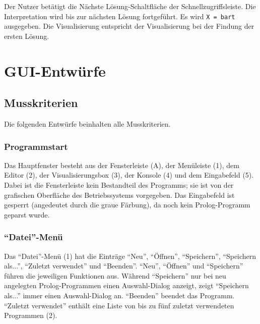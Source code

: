 \documentclass[parskip=full,11pt,twoside]{scrartcl}
\begin{document}
{Der Nutzer betätigt die Nächste Lösung-Schaltfläche der Schnellzugriffsleiste.}
{Die Interpretation wird bis zur nächsten Lösung fortgeführt. Es wird \texttt{X = bart} ausgegeben. Die Visualisierung entspricht der Visualisierung bei der Findung der ersten Lösung.}

\appendix

\section{GUI-Entwürfe}

\subsection{Musskriterien}

Die folgenden Entwürfe beinhalten alle Musskriterien.

\subsubsection{Programmstart}

\begin{minipage}{\linewidth}
\end{minipage}

Das Hauptfenster besteht aus der Fensterleiste (A), der Menüleiste (1), dem Editor (2), der Visualisierungsbox (3), der Konsole (4) und dem Eingabefeld (5).
Dabei ist die Fensterleiste kein Bestandteil des Programms; sie ist von der grafischen Oberfläche des Betriebssystems vorgegeben.
Das Eingabefeld ist gesperrt (angedeutet durch die graue Färbung), da noch kein Prolog-Programm geparst wurde.

\subsubsection{\enquote{Datei}-Menü}

\begin{minipage}{\linewidth}
\end{minipage}

Das \enquote{Datei}-Menü (1) hat die Einträge \enquote{Neu}, \enquote{Öffnen}, \enquote{Speichern}, \enquote{Speichern als...}, \enquote{Zuletzt verwendet} und \enquote{Beenden}.
\enquote{Neu}, \enquote{Öffnen} und \enquote{Speichern} führen die jeweiligen Funktionen aus.
Während \enquote{Speichern} nur bei neu angelegten Prolog-Programmen einen Auswahl-Dialog anzeigt, zeigt \enquote{Speichern als...} immer einen Auswahl-Dialog an.
\enquote{Beenden} beendet das Programm.
\enquote{Zuletzt verwendet} enthält eine Liste von bis zu fünf zuletzt verwendeten Programmen (2).
\end{document}

